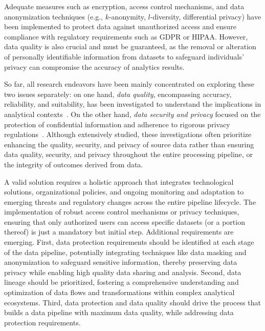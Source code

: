 Adequate measures such as encryption, access control mechanisms, and data anonymization techniques (e.g., $k$-anonymity, $l$-diversity, differential privacy) have been implemented to protect data against unauthorized access and ensure compliance with regulatory requirements such as GDPR or HIPAA. {\color{OurColor}However, data quality is also crucial and must be guaranteed, as the removal or alteration of personally identifiable information from datasets to safeguard individuals' privacy can compromise the accuracy of analytics results.}

So far, all research endeavors have been mainly concentrated on exploring these two issues separately: on one hand, \emph{data quality}, encompassing accuracy, reliability, and suitability, has been investigated to understand the implications in analytical contexts~\cite{ANTONGIACOMO}.  On the other hand, \emph{data security and privacy} focused on the protection of confidential information and adherence to rigorous privacy regulations~\cite{ANTONGIACOMO}. {\color{OurColor}Although extensively studied, these investigations often prioritize enhancing the quality, security, and privacy of source data rather than ensuring data quality, security, and privacy throughout the entire processing pipeline, or the integrity of outcomes derived from data.}

A valid solution requires a holistic approach that integrates technological solutions, organizational policies, and ongoing monitoring and adaptation to emerging threats and regulatory changes {\color{OurColor}across the entire pipeline lifecycle.} The implementation of robust access control mechanisms or privacy techniques, ensuring that only authorized users can access specific datasets (or a portion thereof) is just a mandatory but initial step. 
%
Additional requirements are emerging. First, data protection requirements should be identified at each stage of the data {\color{OurColor}pipeline}, potentially integrating techniques like data masking and anonymization to safeguard sensitive information, thereby preserving data privacy while enabling high quality data sharing and analysis. Second, data lineage should be prioritized, fostering a comprehensive understanding and optimization of data flows and transformations within complex analytical ecosystems. {\color{OurColor}Third, data protection and data quality should drive the process that builds a data pipeline with maximum data quality, while addressing data protection requirements.}

